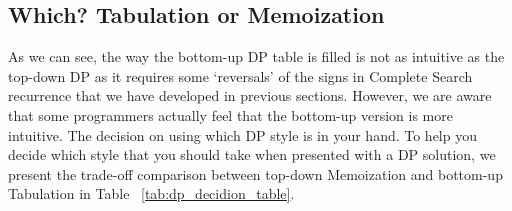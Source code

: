 \documentclass[../main.tex]{subfiles}
\begin{document}
\subsection{Which? Tabulation or Memoization}
\label{subsec_dp_comparison}
As we can see, the way the bottom-up DP table is filled is not as intuitive as the top-down DP as it requires some ‘reversals’ of the signs in Complete Search recurrence that we have developed in previous sections. However, we are aware that some programmers actually feel that the bottom-up
version is more intuitive. The decision on using which DP style is in your hand. To help you decide
which style that you should take when presented with a DP solution, we present the trade-off
comparison between top-down Memoization and bottom-up Tabulation in Table ~\ref{tab:dp_decidion_table}. 
\end{document}

